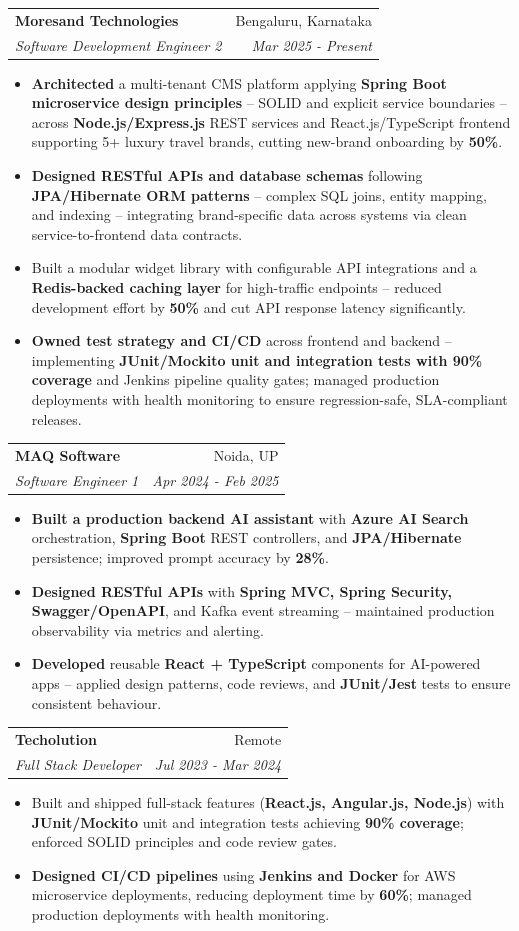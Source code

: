 \documentclass[a4paper,20pt]{article}
\makeatletter
\newcommand{\resumeSubheading}[4]{\vspace{-1pt}\item\begin{tabular*}{0.97\textwidth}{l@{\extracolsep{\fill}}r}\textbf{#1} & #2 \\\textit{#3} & \textit{#4} \\\end{tabular*}\vspace{-5pt}}
\newcommand{\resumeItemListStart}{\begin{itemize}}
\newcommand{\resumeItemListEnd}{\end{itemize}\vspace{-5pt}}
\makeatother
\begin{document}
   \resumeSubheading{Moresand Technologies}{Bengaluru, Karnataka}
      {Software Development Engineer 2}{Mar 2025 - Present}
      \resumeItemListStart
 \item\small{\textbf{Architected} a multi-tenant CMS platform applying \textbf{Spring Boot microservice design principles} -- SOLID and explicit service boundaries -- across \textbf{Node.js/Express.js} REST services and React.js/TypeScript frontend supporting 5+ luxury travel brands, cutting new-brand onboarding by \textbf{50\%}.}
    \item\small{\textbf{Designed RESTful APIs and database schemas} following \textbf{JPA/Hibernate ORM patterns} -- complex SQL joins, entity mapping, and indexing -- integrating brand-specific data across systems via clean service-to-frontend data contracts.}
    \item\small{Built a modular widget library with configurable API integrations and a \textbf{Redis-backed caching layer} for high-traffic endpoints -- reduced development effort by \textbf{50\%} and cut API response latency significantly.}
    \item\small{\textbf{Owned test strategy and CI/CD} across frontend and backend -- implementing \textbf{JUnit/Mockito unit and integration tests with 90\% coverage} and Jenkins pipeline quality gates; managed production deployments with health monitoring to ensure regression-safe, SLA-compliant releases.}
\resumeItemListEnd

\resumeSubheading{MAQ Software}{Noida, UP}
      {Software Engineer 1}{Apr 2024 - Feb 2025}
      \resumeItemListStart
\item\small{\textbf{Built a production backend AI assistant} with \textbf{Azure AI Search} orchestration, \textbf{Spring Boot} REST controllers, and \textbf{JPA/Hibernate} persistence; improved prompt accuracy by \textbf{28\%}.}
\item\small{\textbf{Designed RESTful APIs} with \textbf{Spring MVC, Spring Security, Swagger/OpenAPI}, and Kafka event streaming -- maintained production observability via metrics and alerting.}
\item\small{\textbf{Developed} reusable \textbf{React + TypeScript} components for AI-powered apps -- applied design patterns, code reviews, and \textbf{JUnit/Jest} tests to ensure consistent behaviour.}
\resumeItemListEnd

    \resumeSubheading{Techolution}{Remote}
      {Full Stack Developer}{Jul 2023 - Mar 2024}
      \resumeItemListStart
     \item\small{Built and shipped full-stack features (\textbf{React.js, Angular.js, Node.js}) with \textbf{JUnit/Mockito} unit and integration tests achieving \textbf{90\% coverage}; enforced SOLID principles and code review gates.}
\item\small{\textbf{Designed CI/CD pipelines} using \textbf{Jenkins and Docker} for AWS microservice deployments, reducing deployment time by \textbf{60\%}; managed production deployments with health monitoring.}
      \resumeItemListEnd
\end{document}
